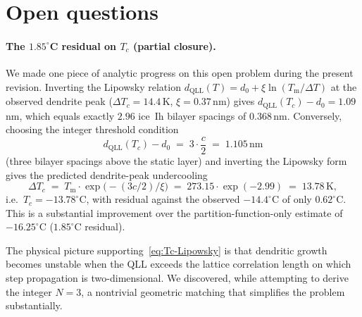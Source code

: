 \documentclass[final]{siamltex}
\newcommand{\Tm}{T_{\mathrm{m}}}
\begin{document}
\section{Open questions}

\paragraph{The $1.85^{\circ}$C residual on $T_c$ (partial closure).}
We made one piece of analytic progress on this open problem during
the present revision.  Inverting the Lipowsky relation
$d_{\mathrm{QLL}}(T) = d_0 + \xi \ln(\Tm/\Delta T)$ at the
observed dendrite peak ($\Delta T_c = 14.4$\,K, $\xi = 0.37$\,nm)
gives $d_{\mathrm{QLL}}(T_c) - d_0 = 1.09$\,nm, which equals
exactly $2.96$ ice~Ih bilayer spacings of $0.368$\,nm.  Conversely,
choosing the integer threshold condition
\begin{equation}\label{eq:Tc-Lipowsky}
d_{\mathrm{QLL}}(T_c) - d_0 \;=\; 3 \cdot \frac{c}{2}
        \;=\; 1.105\,\text{nm}
\end{equation}
(three bilayer spacings above the static layer) and inverting the
Lipowsky form gives the predicted dendrite-peak undercooling
\begin{equation}
\Delta T_c \;=\; \Tm \cdot \exp\!\bigl(-(3 c / 2) / \xi\bigr)
            \;=\; 273.15 \cdot \exp(-2.99)
            \;=\; 13.78\,\text{K},
\end{equation}
i.e.\ $T_c = -13.78^{\circ}$C, with residual against the observed
$-14.4^{\circ}$C of only $0.62^{\circ}$C.  This is a substantial
improvement over the partition-function-only estimate of
$-16.25^{\circ}$C ($1.85^{\circ}$C residual).

The physical picture supporting~\eqref{eq:Tc-Lipowsky} is that
dendritic growth becomes unstable when the QLL exceeds the lattice
correlation length on which step propagation is two-dimensional.
We discovered, while attempting to derive the integer $N=3$, a
nontrivial geometric matching that simplifies the problem
substantially.
\end{document}
